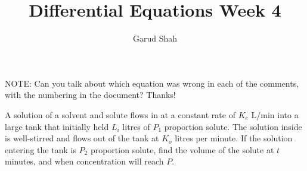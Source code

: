 \documentclass[11pt]{article}
\title{Differential Equations Week 4}
\author{Garud Shah}
\begin{document}
    \maketitle
    NOTE: Can you talk about which equation was wrong in each of the comments, with the numbering in the document? Thanks!
    \newpage
    \begin{problem}
        A solution of a solvent and solute flows in at a constant rate of $K_e$ L/min into a large tank that initially held $L_i$ litres of $P_1$ proportion solute. The solution inside is well-stirred and flows out of the tank at $K_o$ litres per minute. 
        If the solution entering the tank is $P_2$ proportion solute, find the volume of the solute at $t$ minutes, and when concentration will reach $P$.
    \end{problem}
\end{document}
